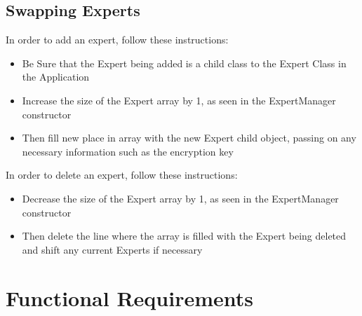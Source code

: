 \documentclass{article}
\begin{document}
\subsection{Swapping Experts}
In order to add an expert, follow these instructions:
\begin{itemize} 
	\item Be Sure that the Expert being added is a child class to the Expert Class in the Application
	\item Increase the size of the Expert array by 1, as seen in the ExpertManager constructor
	\item Then fill new place in array with the new Expert child object, passing on any necessary information such as the encryption key
\end{itemize}
In order to delete an expert, follow these instructions:
\begin{itemize} 
	\item Decrease the size of the Expert array by 1, as seen in the ExpertManager constructor
	\item Then delete the line where the array is filled with the Expert being deleted and shift any current Experts if necessary 
\end{itemize}

\section{Functional Requirements}

\newpage
\listoffigures
\end{document}
